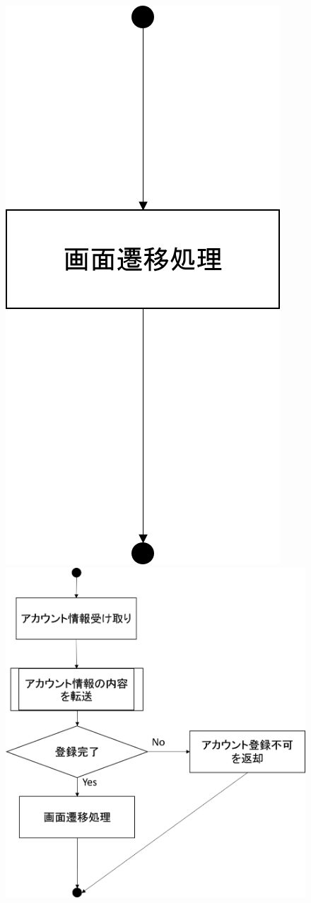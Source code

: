 \begin{figure}[htbp]
 \begin{minipage}{0.5\hsize}
  \begin{center}
   \includegraphics[width=0.5\linewidth,clip]{./img/admin_create_account/sub1.png}
  \end{center}
 \end{minipage}
 \begin{minipage}{0.5\hsize}
  \begin{center}
   \includegraphics[width=1\linewidth,clip]{./img/admin_create_account/sub2.png}

\end{center}
\end{minipage}
\end{figure}

